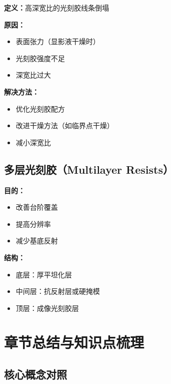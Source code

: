 \documentclass[UTF8,12pt,a4paper]{ctexart}
\begin{document}
\textbf{定义：}高深宽比的光刻胶线条倒塌

\textbf{原因：}
\begin{itemize}
    \item 表面张力（显影液干燥时）
    \item 光刻胶强度不足
    \item 深宽比过大
\end{itemize}

\textbf{解决方法：}
\begin{itemize}
    \item 优化光刻胶配方
    \item 改进干燥方法（如临界点干燥）
    \item 减小深宽比
\end{itemize}

\subsection{多层光刻胶（Multilayer Resists）}

\textbf{目的：}
\begin{itemize}
    \item 改善台阶覆盖
    \item 提高分辨率
    \item 减少基底反射
\end{itemize}

\textbf{结构：}
\begin{itemize}
    \item 底层：厚平坦化层
    \item 中间层：抗反射层或硬掩模
    \item 顶层：成像光刻胶层
\end{itemize}

\section{章节总结与知识点梳理}

\subsection{核心概念对照}
\end{document}
